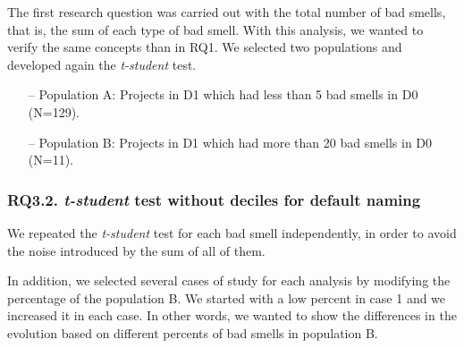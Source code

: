 The first research question was carried out with the total number of bad smells, that is, the sum of each type of bad smell. With this analysis, we wanted to verify the same concepts than in RQ1. We selected two populations and developed again the \textit{t-student} test.

\begin{itemize}
    \item[--] Population A: Projects in D1 which had less than 5 bad smells in D0 (N=129).
    \item[--] Population B: Projects in D1 which had more than 20 bad smells in D0 (N=11).
\end{itemize}


\subsubsection{RQ3.2. \textit{t-student} test without deciles for default naming}
\label{subsubsec:RQ3_2_statistical}

We repeated the \textit{t-student} test for each bad smell independently, in order to avoid the noise introduced by the sum of all of them.

In addition, we selected several cases of study for each analysis by modifying the percentage of the population B. We started with a low percent in case 1 and we increased it in each case. In other words, we wanted to show the differences in the evolution based on different percents of bad smells in population B.

